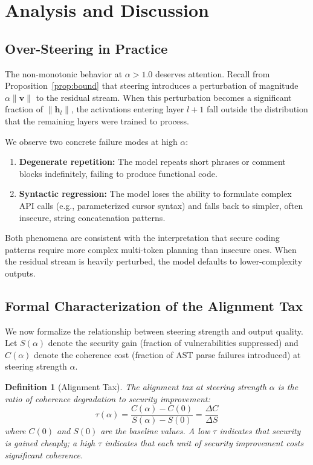 \documentclass[journal, onecolumn]{IEEEtran}
\newtheorem{definition}{Definition}
\begin{document}
\section{Analysis and Discussion}

\subsection{Over-Steering in Practice}
\label{sec:oversteering_emp}

The non-monotonic behavior at $\alpha > 1.0$ deserves attention. Recall from Proposition~\ref{prop:bound} that steering introduces a perturbation of magnitude $\alpha\|\bm{v}\|$ to the residual stream. When this perturbation becomes a significant fraction of $\|\bm{h}_l\|$, the activations entering layer $l+1$ fall outside the distribution that the remaining layers were trained to process.

We observe two concrete failure modes at high $\alpha$:
\begin{enumerate}
    \item \textbf{Degenerate repetition:} The model repeats short phrases or comment blocks indefinitely, failing to produce functional code.
    \item \textbf{Syntactic regression:} The model loses the ability to formulate complex API calls (e.g., parameterized cursor syntax) and falls back to simpler, often insecure, string concatenation patterns.
\end{enumerate}

Both phenomena are consistent with the interpretation that secure coding patterns require more complex multi-token planning than insecure ones. When the residual stream is heavily perturbed, the model defaults to lower-complexity outputs.

\subsection{Formal Characterization of the Alignment Tax}
\label{sec:alignment_tax}

We now formalize the relationship between steering strength and output quality. Let $S(\alpha)$ denote the security gain (fraction of vulnerabilities suppressed) and $C(\alpha)$ denote the coherence cost (fraction of AST parse failures introduced) at steering strength $\alpha$.

\begin{definition}[Alignment Tax]
\label{def:tax}
The alignment tax at steering strength $\alpha$ is the ratio of coherence degradation to security improvement:
\begin{equation}
    \tau(\alpha) = \frac{C(\alpha) - C(0)}{S(\alpha) - S(0)} = \frac{\Delta C}{\Delta S}
    \label{eq:tax}
\end{equation}
where $C(0)$ and $S(0)$ are the baseline values. A low $\tau$ indicates that security is gained cheaply; a high $\tau$ indicates that each unit of security improvement costs significant coherence.
\end{definition}
\end{document}
